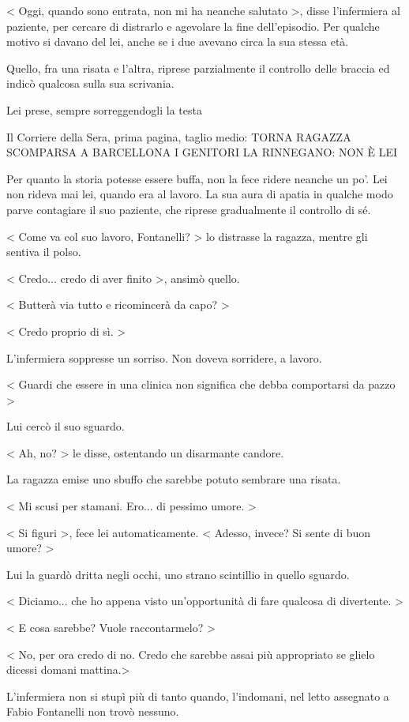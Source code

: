 < Oggi, quando sono entrata, non mi ha neanche salutato >, disse l'infermiera al paziente, per cercare di distrarlo e agevolare la fine dell'episodio. Per qualche motivo si davano del lei, anche se i due avevano circa la sua stessa età.

Quello, fra una risata e l'altra, riprese parzialmente il controllo delle braccia ed indicò qualcosa sulla sua scrivania.

Lei prese, sempre sorreggendogli la testa

Il Corriere della Sera, prima pagina, taglio medio:
TORNA RAGAZZA SCOMPARSA A BARCELLONA
I GENITORI LA RINNEGANO: NON È LEI

Per quanto la storia potesse essere buffa, non la fece ridere neanche un po'. Lei non rideva mai lei, quando era al lavoro. La sua aura di apatia in qualche modo parve contagiare il suo paziente, che riprese gradualmente il controllo di sé.

< Come va col suo lavoro, Fontanelli? > lo distrasse la ragazza, mentre gli sentiva il polso.

< Credo... credo di aver finito >, ansimò quello. 

< Butterà via tutto e ricomincerà da capo? >

< Credo proprio di sì. >

L'infermiera soppresse un sorriso. Non doveva sorridere, a lavoro.

< Guardi che essere in una clinica non significa che debba comportarsi da pazzo >

Lui cercò il suo sguardo.

< Ah, no? > le disse, ostentando un disarmante candore.

La ragazza emise uno sbuffo che sarebbe potuto sembrare una risata.

< Mi scusi per stamani. Ero... di pessimo umore. >

< Si figuri >, fece lei automaticamente. < Adesso, invece? Si sente di buon umore? >

Lui la guardò dritta negli occhi, uno strano scintillio in quello sguardo.

< Diciamo... che ho appena visto un'opportunità di fare qualcosa di divertente. >

< E cosa sarebbe? Vuole raccontarmelo? >

< No, per ora credo di no. Credo che sarebbe assai più appropriato se glielo dicessi domani mattina.>

L'infermiera non si stupì più di tanto quando, l'indomani, nel letto assegnato a Fabio Fontanelli non trovò nessuno.









